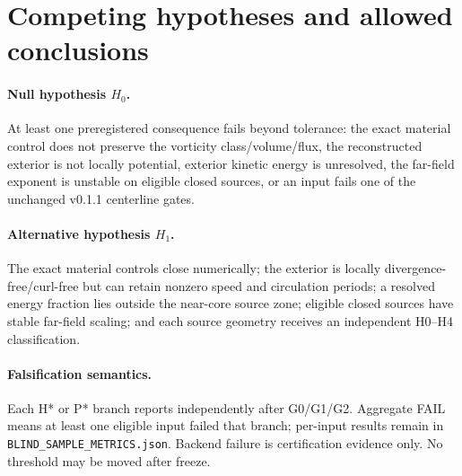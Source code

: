 \documentclass[11pt,a4paper]{article}
\begin{document}
\section{Competing hypotheses and allowed conclusions}
\paragraph{Null hypothesis $H_0$.}
At least one preregistered consequence fails beyond tolerance: the exact material control does not preserve the vorticity class/volume/flux, the reconstructed exterior is not locally potential, exterior kinetic energy is unresolved, the far-field exponent is unstable on eligible closed sources, or an input fails one of the unchanged v0.1.1 centerline gates.

\paragraph{Alternative hypothesis $H_1$.}
The exact material controls close numerically; the exterior is locally divergence-free/curl-free but can retain nonzero speed and circulation periods; a resolved energy fraction lies outside the near-core source zone; eligible closed sources have stable far-field scaling; and each source geometry receives an independent H0--H4 classification.

\paragraph{Falsification semantics.}
Each H* or P* branch reports independently after G0/G1/G2. Aggregate FAIL means at least one eligible input failed that branch; per-input results remain in \texttt{BLIND\_SAMPLE\_METRICS.json}. Backend failure is certification evidence only. No threshold may be moved after freeze.

\end{document}
